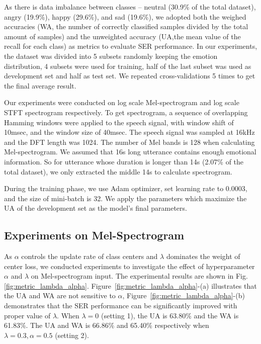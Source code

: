\documentclass{article}
\begin{document}
As there is data imbalance between classes -- neutral (30.9\% of the total dataset), angry (19.9\%), happy (29.6\%), and sad (19.6\%), we adopted both the weighed accuracies ({WA},  the number of correctly classified samples divided by the total amount of samples) and the unweighted accuracy ({UA},the mean value of the recall for each class) as metrics to evaluate SER performance.  In our experiments, the dataset was divided into 5 subsets randomly keeping the emotion distribution, 4 subsets were used for training, half of the last subset was used as development set and half as test set. We repeated cross-validations  5 times to get the final average result.

Our experiments were conducted on log scale Mel-spectrogram and log scale STFT spectrogram respectively. To get spectrogram, a sequence of overlapping Hamming windows were applied to the speech signal, with window shift of 10msec, and the window size of 40msec. The speech signal was sampled at 16kHz and the DFT length was 1024. The number of Mel bands is 128 when calculating Mel-spectrogram. We assumed that 16s long utterance contains enough emotional information. So for utterance whose duration is longer than 14s (2.07\% of the total dataset), we only extracted the middle 14s to calculate spectrogram. 

During the training phase, we use Adam \cite{kingma2014adam} optimizer, set learning rate to 0.0003, and the size of mini-batch is 32. We apply the parameters which maximize the UA of the development set as the model's final parameters.


\subsection{Experiments on Mel-Spectrogram}

As $\alpha$ controls the update rate of class centers and $\lambda$ dominates the weight of center loss, we conducted experiments to investigate the effect of hyperparameter $\alpha$ and $\lambda$ on Mel-spectrogram input. The  experimental results are shown in Fig.\ref{fig:metric_lambda_alpha}. Figure~\ref{fig:metric_lambda_alpha}-(a) illustrates that the UA and WA  are not sensitive to $\alpha$, Figure~\ref{fig:metric_lambda_alpha}-(b) demonstrates that the SER performance can be significantly improved with proper value of $\lambda$. When $\lambda=0$ ({setting 1}), the UA is 63.80\% and the WA is 61.83\%. The UA and WA is 66.86\% and 65.40\% respectively when $\lambda=0.3, \alpha=0.5$ ({setting 2}).
\end{document}
